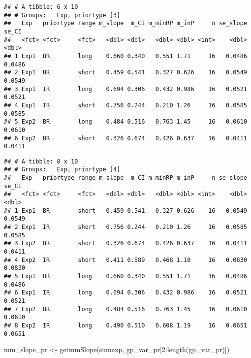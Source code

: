\documentclass[
]{article}
\newenvironment{Shaded}{\begin{snugshade}}{\end{snugshade}}
\newcommand{\AttributeTok}[1]{\textcolor[rgb]{0.77,0.63,0.00}{#1}}
\newcommand{\DecValTok}[1]{\textcolor[rgb]{0.00,0.00,0.81}{#1}}
\newcommand{\FunctionTok}[1]{\textcolor[rgb]{0.00,0.00,0.00}{#1}}
\newcommand{\NormalTok}[1]{#1}
\newcommand{\OtherTok}[1]{\textcolor[rgb]{0.56,0.35,0.01}{#1}}
\newcommand{\SpecialCharTok}[1]{\textcolor[rgb]{0.00,0.00,0.00}{#1}}
\newcommand{\StringTok}[1]{\textcolor[rgb]{0.31,0.60,0.02}{#1}}
\begin{document}
\begin{verbatim}
## # A tibble: 6 x 10
## # Groups:   Exp, priortype [3]
##   Exp   priortype range m_slope  m_CI m_minRP m_inP     n se_slope  se_CI
##   <fct> <fct>     <fct>   <dbl> <dbl>   <dbl> <dbl> <int>    <dbl>  <dbl>
## 1 Exp1  BR        long    0.660 0.340   0.551 1.71     16   0.0486 0.0486
## 2 Exp1  BR        short   0.459 0.541   0.327 0.626    16   0.0549 0.0549
## 3 Exp1  IR        long    0.694 0.306   0.432 0.986    16   0.0521 0.0521
## 4 Exp1  IR        short   0.756 0.244   0.210 1.26     16   0.0585 0.0585
## 5 Exp2  BR        long    0.484 0.516   0.763 1.45     16   0.0610 0.0610
## 6 Exp2  BR        short   0.326 0.674   0.426 0.637    16   0.0411 0.0411
\end{verbatim}

\begin{Shaded}
\end{Shaded}

\begin{verbatim}
## # A tibble: 8 x 10
## # Groups:   Exp, priortype [4]
##   Exp   priortype range m_slope  m_CI m_minRP m_inP     n se_slope  se_CI
##   <fct> <fct>     <fct>   <dbl> <dbl>   <dbl> <dbl> <int>    <dbl>  <dbl>
## 1 Exp1  BR        short   0.459 0.541   0.327 0.626    16   0.0549 0.0549
## 2 Exp1  IR        short   0.756 0.244   0.210 1.26     16   0.0585 0.0585
## 3 Exp2  BR        short   0.326 0.674   0.426 0.637    16   0.0411 0.0411
## 4 Exp2  IR        short   0.411 0.589   0.468 1.10     16   0.0830 0.0830
## 5 Exp1  BR        long    0.660 0.340   0.551 1.71     16   0.0486 0.0486
## 6 Exp1  IR        long    0.694 0.306   0.432 0.986    16   0.0521 0.0521
## 7 Exp2  BR        long    0.484 0.516   0.763 1.45     16   0.0610 0.0610
## 8 Exp2  IR        long    0.490 0.510   0.608 1.19     16   0.0651 0.0651
\end{verbatim}

\begin{Shaded}
\begin{Highlighting}[]
\NormalTok{mm\_slope\_pr }\OtherTok{\textless{}{-}} \FunctionTok{getmmSlope}\NormalTok{(sumexp, gp\_var\_pr[}\DecValTok{2}\SpecialCharTok{:}\FunctionTok{length}\NormalTok{(gp\_var\_pr)])}
\end{Highlighting}
\end{Shaded}
\end{document}
